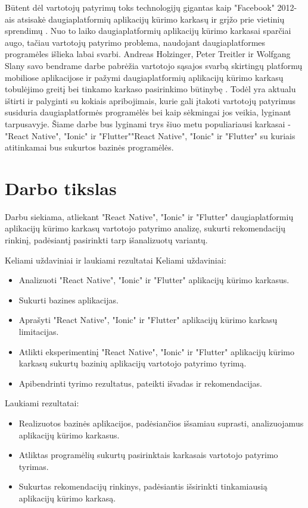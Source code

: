 \documentclass{VUMIFInfBakalaurinis}
\begin{document}
Būtent dėl vartotojų patyrimų toks technologijų gigantas kaip "Facebook" 2012-ais atsisakė daugiaplatformių aplikacijų kūrimo
karkasų ir grįžo prie vietinių sprendimų \cite{facebook}. Nuo to laiko daugiaplatformių aplikacijų kūrimo karkasai sparčiai
augo, tačiau vartotojų patyrimo problema, naudojant daugiaplatformes programėles išlieka labai svarbi.
Andreas Holzinger, Peter Treitler ir Wolfgang Slany savo bendrame darbe pabrėžia vartotojo sąsajos svarbą skirtingų platformų mobiliose aplikacijose
ir pažymi daugiaplatformių aplikacijų kūrimo karkasų tobulėjimo greitį bei tinkamo karkaso pasirinkimo būtinybę \cite{usable}.
Todėl yra aktualu ištirti ir palyginti su kokiais apribojimais, kurie gali įtakoti vartotojų patyrimus susiduria daugiaplatformės programėlės bei
kaip sėkmingai jos veikia, lyginant tarpusavyje. Šiame darbe bus lyginami trys šiuo metu populiariausi karkasai - "React Native", "Ionic" ir "Flutter""React Native", "Ionic" ir "Flutter" \cite{popularframeworks}
su kuriais atitinkamai bus sukurtos bazinės programėlės.

\section{Darbo tikslas}
Darbu siekiama, atliekant "React Native", "Ionic" ir "Flutter" daugiaplatformių aplikacijų kūrimo karkasų vartotojo patyrimo analizę, sukurti rekomendacijų rinkinį, padėsiantį pasirinkti tarp išanalizuotų variantų.

\begin {section}{Keliami uždaviniai ir laukiami rezultatai}
Keliami uždaviniai:
\begin{itemize}
  \item Analizuoti "React Native", "Ionic" ir "Flutter" aplikacijų kūrimo karkasus.
  \item Sukurti bazines aplikacijas.
  \item Aprašyti "React Native", "Ionic" ir "Flutter" aplikacijų kūrimo karkasų limitacijas.
  \item Atlikti eksperimentinį "React Native", "Ionic" ir "Flutter" aplikacijų kūrimo karkasų sukurtų bazinių aplikacijų vartotojo patyrimo tyrimą.
  \item Apibendrinti tyrimo rezultatus, pateikti išvadas ir rekomendacijas.
\end{itemize}

Laukiami rezultatai:
\begin{itemize}
  \item Realizuotos bazinės aplikacijos, padėsiančios išsamiau suprasti, analizuojamus aplikacijų kūrimo karkasus.
  \item Atliktas programėlių sukurtų pasirinktais karkasais vartotojo patyrimo tyrimas.
  \item Sukurtas rekomendacijų rinkinys, padėsiantis išsirinkti tinkamiausią aplikacijų kūrimo karkasą.
\end{itemize}

\end{section}
\end{document}
